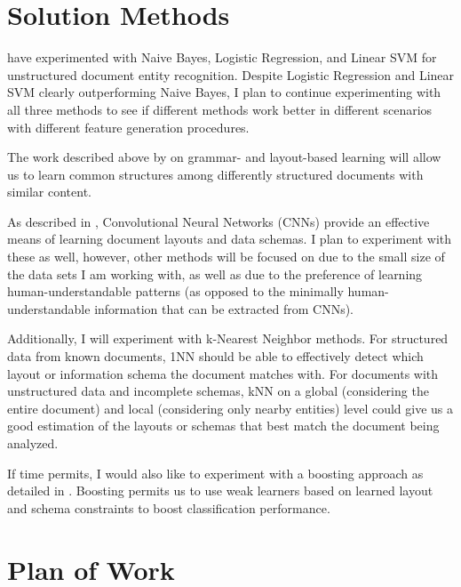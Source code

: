 \documentclass[twoside,11pt]{article}
\renewcommand{\>}{{\rightarrow}}
\newcommand{\1}{{\mathbf 1}}
\newcommand{\0}{{\mathbf 0}}
\begin{document}

\section{Solution Methods}

\cite{LiuWanZhang2016} have experimented with Naive Bayes, Logistic Regression, and Linear SVM for unstructured document entity recognition. Despite Logistic Regression and Linear SVM clearly outperforming Naive Bayes, I plan to continue experimenting with all three methods to see if different methods work better in different scenarios with different feature generation procedures.

The work described above by \cite{Thakur2012, Dejean2015} on grammar- and layout-based learning will allow us to learn common structures among differently structured documents with similar content.

As described in \cite{Gogar2016, Meerkamp2016, Kumar2017, Nguyen2017}, Convolutional Neural Networks (CNNs) provide an effective means of learning document layouts and data schemas. I plan to experiment with these as well, however, other methods will be focused on due to the small size of the data sets I am working with, as well as due to the preference of learning human-understandable patterns (as opposed to the minimally human-understandable information that can be extracted from CNNs).

Additionally, I will experiment with k-Nearest Neighbor methods. For structured data from known documents, 1NN should be able to effectively detect which layout or information schema the document matches with. For documents with unstructured data and incomplete schemas, kNN on a global (considering the entire document) and local (considering only nearby entities) level could give us a good estimation of the layouts or schemas that best match the document being analyzed.

If time permits, I would also like to experiment with a boosting approach as detailed in \cite{Ives2003}. Boosting permits us to use weak learners based on learned layout and schema constraints to boost classification performance.


\section{Plan of Work}
\end{document}
